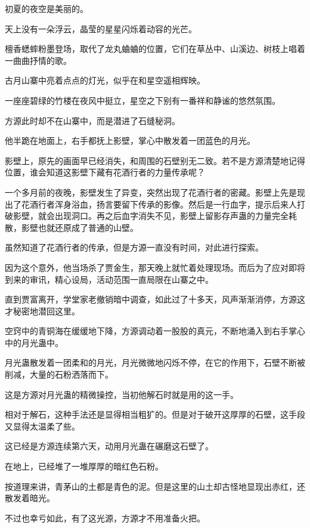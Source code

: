 
\begin{this_body}

初夏的夜空是美丽的。

天上没有一朵浮云，晶莹的星星闪烁着动容的光芒。

檀香蟋蟀粉墨登场，取代了龙丸蛐蛐的位置，它们在草丛中、山溪边、树枝上唱着一曲曲抒情的歌。

古月山寨中亮着点点的灯光，似乎在和星空遥相辉映。

一座座碧绿的竹楼在夜风中挺立，星空之下别有一番祥和静谧的悠然氛围。

方源此时却不在山寨中，而是潜进了石缝秘洞。

他半跪在地面上，右手都抚上影壁，掌心中散发着一团蓝色的月光。

影壁上，原先的画面早已经消失，和周围的石壁别无二致。若不是方源清楚地记得位置，谁会知道这影壁下藏有花酒行者的力量传承呢？

一个多月前的夜晚，影壁发生了异变，突然出现了花酒行者的密藏。影壁上先是现出了花酒行者浑身浴血，扬言要留下传承的影像。然后是一行血字，提示后来人打破影壁，就会出现洞口。再之后血字消失不见，影壁上留影存声蛊的力量完全耗散，影壁也就还原成了普通的山壁。

虽然知道了花酒行者的传承，但是方源一直没有时间，对此进行探索。

因为这个意外，他当场杀了贾金生，那天晚上就忙着处理现场。而后为了应对即将到来的审讯，精心设局，活动范围一直局限在山寨之中。

直到贾富离开，学堂家老撤销暗中调查，如此过了十多天，风声渐渐消停，方源这才秘密地潜回这里。

空窍中的青铜海在缓缓地下降，方源调动着一股股的真元，不断地涌入到右手掌心中的月光蛊中。

月光蛊散发着一团柔和的月光，月光微微地闪烁不停，在它的作用下，石壁不断被削减，大量的石粉洒落而下。

这是方源对月光蛊的精微操控，当初他解石时就是用的这一手。

相对于解石，这种手法还是显得相当粗犷的。但是对于破开这厚厚的石壁，这手段又显得太温柔了些。

这已经是方源连续第六天，动用月光蛊在碾磨这石壁了。

在地上，已经堆了一堆厚厚的暗红色石粉。

按道理来讲，青茅山的土都是青色的泥。但是这里的山土却古怪地显现出赤红，还散发着暗光。

不过也幸亏如此，有了这光源，方源才不用准备火把。


\end{this_body}
